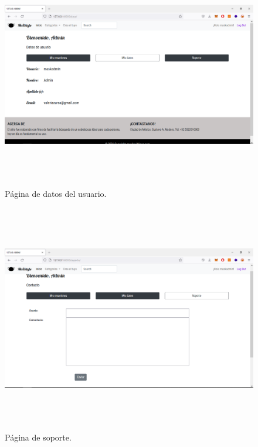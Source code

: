 \documentclass[letterpaper,12pt]{article}
\begin{document}
\begin{figure}[H]
	\includegraphics[width=18cm, height=10cm]{11}
	\centering
	\caption{Página de datos del usuario.}
\end{figure}
\begin{figure}[H]
	\includegraphics[width=18cm, height=10cm]{12}
	\centering
	\caption{Página de soporte.}
\end{figure}
\end{document}
